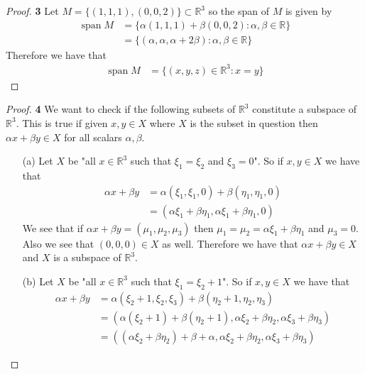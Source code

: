 \documentclass[11pt]{article}
\newcommand{\R}{\mathbb{R}}
\theoremstyle{definition}
\begin{document}
\cleardoublepage
\begin{proof}{\textbf{3}}
    Let $M = \{(1,1,1), (0,0,2)\} \subset \R^3$ so the span of $M$ is given by
    \begin{align*}
        \operatorname{span} M &=
        \{\alpha(1,1,1) + \beta(0,0,2) : \alpha, \beta \in \R \}\\
        &= \{(\alpha,\alpha,\alpha + 2\beta) : \alpha, \beta \in \R \}
    \end{align*}
    Therefore we have that 
    \begin{align*} 
        \operatorname{span} M &= \{(x,y,z) \in \R^3 : x = y\}
    \end{align*}
\end{proof}
\begin{proof}{\textbf{4}}
    We want to check if the following subsets of $\R^3$ constitute
    a subspace of $\R^3$. This is true if given $x,y \in X$ where $X$ is the
    subset in question then $\alpha x + \beta y \in X$ for all scalars
    $\alpha, \beta$.
    \begin{itemize}
        \item [(a)] Let $X$ be "all $x \in \R^3$ such that $\xi_1 = \xi_2$ and
        $\xi_3 = 0$". So if $x, y \in X$ we have that
        \begin{align*}
            \alpha x + \beta y
                &= \alpha (\xi_1, \xi_1, 0) + \beta (\eta_1, \eta_1, 0)\\
                &= (\alpha\xi_1 + \beta\eta_1, \alpha\xi_1 + \beta\eta_1, 0)
        \end{align*}
        We see that if $\alpha x + \beta y = (\mu_1, \mu_2, \mu_3)$ then
        $\mu_1 = \mu_2 = \alpha\xi_1 + \beta\eta_1$ and $\mu_3 = 0$.
        Also we see that $(0, 0, 0) \in X$ as well.
        Therefore we have that $\alpha x + \beta y \in X$ and
        $X$ is a subspace of $\R^3$.
        \item [(b)] Let $X$ be "all $x \in \R^3$ such that $\xi_1 = \xi_2 + 1$".
        So if $x, y \in X$ we have that
        \begin{align*}
            \alpha x + \beta y
                &= \alpha (\xi_2 + 1, \xi_2, \xi_3) + \beta (\eta_2 + 1, \eta_2, \eta_3)\\
                &= (\alpha(\xi_2 + 1) + \beta(\eta_2 + 1),
                \alpha\xi_2 + \beta\eta_2, \alpha\xi_3 + \beta\eta_3)\\
                &= ((\alpha\xi_2 + \beta\eta_2) + \beta + \alpha,
                \alpha\xi_2 + \beta\eta_2, \alpha\xi_3 + \beta\eta_3)

\end{align*}
\end{itemize}
\end{proof}
\end{document}
